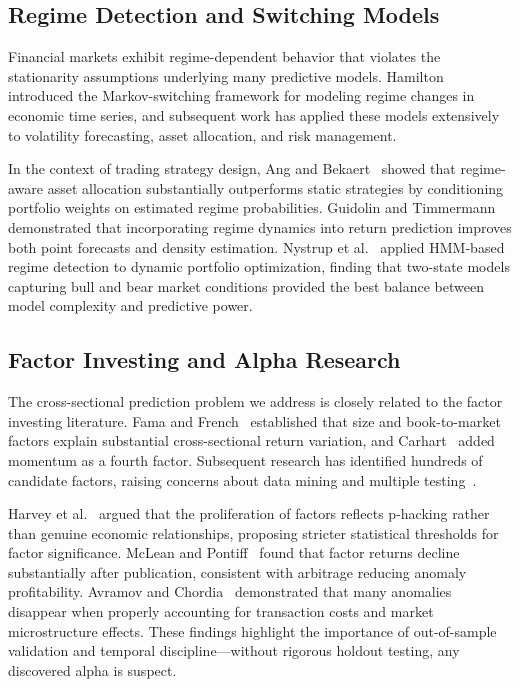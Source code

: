 \documentclass{ieeeaccess}
\begin{document}
\subsection{Regime Detection and Switching Models}
Financial markets exhibit regime-dependent behavior that violates the stationarity assumptions underlying many predictive models. Hamilton~\cite{b7} introduced the Markov-switching framework for modeling regime changes in economic time series, and subsequent work has applied these models extensively to volatility forecasting, asset allocation, and risk management.

In the context of trading strategy design, Ang and Bekaert~\cite{b14} showed that regime-aware asset allocation substantially outperforms static strategies by conditioning portfolio weights on estimated regime probabilities. Guidolin and Timmermann~\cite{b15} demonstrated that incorporating regime dynamics into return prediction improves both point forecasts and density estimation. Nystrup et al.~\cite{b16} applied HMM-based regime detection to dynamic portfolio optimization, finding that two-state models capturing bull and bear market conditions provided the best balance between model complexity and predictive power.

\subsection{Factor Investing and Alpha Research}
The cross-sectional prediction problem we address is closely related to the factor investing literature. Fama and French~\cite{b1} established that size and book-to-market factors explain substantial cross-sectional return variation, and Carhart~\cite{b2} added momentum as a fourth factor. Subsequent research has identified hundreds of candidate factors, raising concerns about data mining and multiple testing~\cite{b17}.

Harvey et al.~\cite{b18} argued that the proliferation of factors reflects p-hacking rather than genuine economic relationships, proposing stricter statistical thresholds for factor significance. McLean and Pontiff~\cite{b3} found that factor returns decline substantially after publication, consistent with arbitrage reducing anomaly profitability. Avramov and Chordia~\cite{b26} demonstrated that many anomalies disappear when properly accounting for transaction costs and market microstructure effects. These findings highlight the importance of out-of-sample validation and temporal discipline---without rigorous holdout testing, any discovered alpha is suspect.
\end{document}
